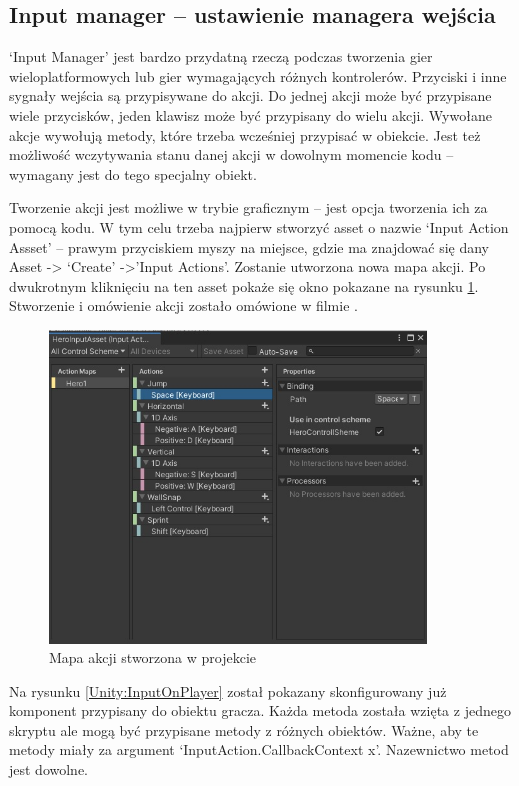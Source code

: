 \documentclass[12pt,twoside]{article}
\begin{document}
\subsection{Input manager -- ustawienie managera wejścia}
`Input Manager' jest bardzo przydatną rzeczą podczas tworzenia gier
wieloplatformowych lub gier wymagających różnych kontrolerów. Przyciski i inne
sygnały wejścia są przypisywane do akcji. Do jednej akcji może być przypisane
wiele przycisków, jeden klawisz może być przypisany do wielu akcji. Wywołane
akcje wywołują metody, które trzeba wcześniej przypisać w obiekcie. Jest też
możliwość wczytywania stanu danej akcji w dowolnym momencie kodu -- wymagany jest
do tego specjalny obiekt.

Tworzenie akcji jest możliwe w trybie graficznym –
jest opcja tworzenia ich za pomocą kodu. W tym celu trzeba najpierw stworzyć
asset o nazwie `Input Action Assset' -- prawym przyciskiem myszy na miejsce,
gdzie ma znajdować się dany Asset -> `Create' ->'Input Actions'. Zostanie
utworzona nowa mapa akcji. Po dwukrotnym kliknięciu na ten asset pokaże się okno
pokazane na rysunku \ref{Unity:ActionMap}. Stworzenie i omówienie akcji zostało
omówione w filmie \cite{unity_action_editor}.

\begin{figure}[!ht]
    \centering
	\includegraphics[width=10cm]{RealizacjaProjektu/UnityPictires/InputActionMap.jpg}
	\caption{Mapa akcji stworzona w projekcie}
    \label{Unity:ActionMap}
\end{figure}

Na rysunku \ref{Unity:InputOnPlayer} został pokazany skonfigurowany już
komponent przypisany do obiektu gracza. Każda metoda została wzięta z jednego
skryptu ale mogą być przypisane metody z różnych obiektów. Ważne, aby te metody
miały za argument `InputAction.CallbackContext x'. Nazewnictwo metod jest
dowolne.   
\end{document}
